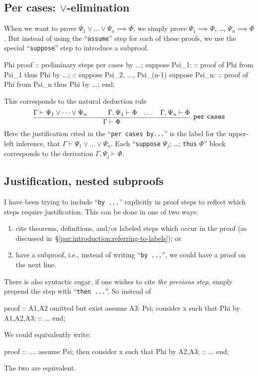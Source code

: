 \subsection{Per cases: $\lor$-elimination}
When we want to prove $\Psi_{1}\lor\dots\lor\Psi_{n}\implies \Phi$,
we simply prove $\Psi_{1}\implies\Phi$, \dots, $\Psi_{n}\implies\Phi$.
But instead of using the ``\verb#assume#'' step for each of these
proofs, we use the special ``\verb#suppose#'' step to introduce a
subproof.
\begin{mizar}
Phi
proof
  :: preliminary steps
  per cases by ...;
  suppose Psi_1:
    :: proof of Phi from Psi_1
    thus Phi by ...;
  :: suppose Psi_2, ..., Psi_(n-1)
  suppose Psi_n:
    :: proof of Phi from Psi_n
    thus Phi by ...;
end;
\end{mizar}
This corresponds to the natural deduction rule
\begin{equation}
  \vcenter{\infer[\mathtt{per~cases}]{\Gamma\vdash \Phi}{%
    \Gamma\vdash\Psi_{1}\lor\dots\lor\Psi_{n}
    & \qquad\Gamma,\Psi_{1}\vdash\Phi
    & \dots
    & \Gamma,\Psi_{n}\vdash\Phi}}
\end{equation}
Here the justification cited in the ``\verb#per cases by...#'' is the
label for the upper-left inference, that $\Gamma\vdash\Psi_{1}\lor\dots\lor\Psi_{n}$.
Each ``\verb#suppose# $\Psi_{j}$; \dots; \verb#thus# $\Phi$'' block
corresponds to the derivation $\Gamma,\Psi_{j}\vdash\Phi$.

\subsection{Justification, nested subproofs}
I have been trying to include ``\verb#by ...#'' explicitly in proof
steps to reflect which steps require justification. This can be done in
one of two ways:
\begin{enumerate}
\item cite theorems, definitions, and/or labeled steps which occur in
  the proof (as discussed in~\S\ref{par:introduction:referring-to-labels}); or
\item have a subproof, i.e., instead of writing ``\verb#by ...#'', we
  could have a proof on the next line.
\end{enumerate}
There is also syntactic sugar, if one wishes to cite \emph{the previous step},
simply prepend the step with ``\verb#then ...#''. So instead of
\begin{mizar}
proof
  :: A1,A2 omitted but exist
  assume A3: Psi;
  consider x such that Phi by A1,A2,A3;
  :: ...
end;
\end{mizar}
We could equivalently write:
\begin{mizar}
proof
  :: ....
  assume Psi;
  then consider x such that Phi by A2,A3;
  :: ...
end;
\end{mizar}
The two are equivalent.

